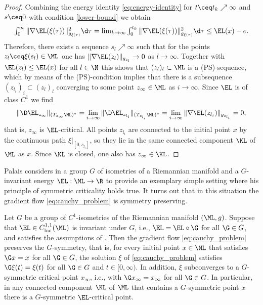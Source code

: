\begin{proof}
Combining the energy identity \cref{eq:energy-identity} for 
$t \ceq t_k\nearrow\infty$ and 
$s \ceq 0$ with condition \ref{lower-bound}
we obtain
$$
\textstyle
\int_0^\infty\|\nabla\EL(\xi(\tau))\|^2_{g_{\xi(\tau)}}\d \tau=
\lim_{k\to\infty}\int_0^{t_k}\|\nabla\EL(\xi(\tau))\|^2_{g_{\xi(\tau)}}\d \tau
\le \EL(x)-e.
$$
Therefore, there exists a sequence $s_l\nearrow\infty$ such that
for the points $z_l \ceq \xi(s_l)\in\ML$ one has
$\|\nabla\EL(z_l)\|_{g_{z_l}}\to 0$ 
as $l\to\infty$. Together with 
$\EL(z_l)\le\EL(x)$ for all $l\in\N$ this shows that
$(z_l)_l\subset\ML$ is a (PS)-sequence, which by means of the (PS)-condition
implies
that there is a subsequence $(z_{l_i})_i\subset (z_l)_l$ 
converging to some point
$z_\infty\in\ML$ as $i\to\infty$. Since $\EL$ is of class $C^1$ we find
$$
\|\D\EL_{z_\infty}\|_{(T_{z_\infty}\ML)^*}=\lim_{i\to\infty}
\|\D\EL_{z_{l_i}}\|_{(T_{z_{l_i}}\ML)^*}=\lim_{i\to\infty}
\|\nabla\EL(z_{l_i})\|_{g_{z_{l_i}}}=0,
$$
that is, $z_\infty$ is $\EL$-critical. 
All points $z_{l_i}$ are connected to the initial point $x$ by
the continuous path $\xi|_{[0,s_{l_i}]}$, so they lie in the same
connected component $\KL$ of $\ML$ as $x$. Since $\KL$ is closed,
one also has $z_\infty\in\KL$.
\end{proof}
Palais considers in \cite[Section 2]{palais_1979} a group $G$ of
isometries of a Riemannian manifold and a $G$-invariant energy $\EL:\ML\to
\R$ to provide an exemplary simple setting where his
principle of symmetric criticality holds true. It turns out that in this
situation the gradient flow \cref{eq:cauchy_problem} is symmetry
preserving.
\begin{proposition}
\label{prop:symmetry-preserving-grad-flow}
Let $G$ be a group of $C^1$-isometries of the Riemannian manifold $(\ML,g)$. 
Suppose
that $\EL\in C^{1,1}_\textnormal{loc}(\ML)$ is invariant under $G$, i.e.,
$\EL=\EL\circ\G$ for all $\G\in G$, and satisfies the assumptions of
. Then the gradient flow 
\cref{eq:cauchy_problem} preserves the $G$-symmetry, that is,
for every initial point $x\in\ML$ that satisfies $\G x=x$ for all $\G\in G$, the solution
$\xi$ of \cref{eq:cauchy_problem}  satisfies $\G \xi(t)=\xi(t)$ for all
$\G \in G$ and $t\in [0,\infty)$. In addition, $\xi$ subconverges to a 
$G$-symmetric critical point $x_\infty$, i.e., with $\G x_\infty = x_\infty$
for all $\G\in G$.
In particular, in any connected component $\KL$ of $\ML$ that contains
a $G$-symmetric point $x$ there is a $G$-symmetric $\EL$-critical point.
\end{proposition}
